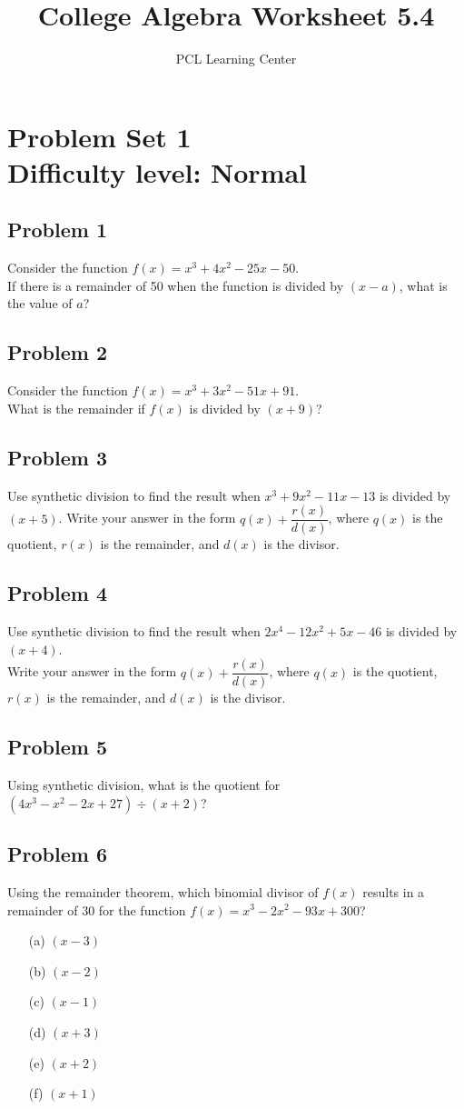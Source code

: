 \documentclass[12pt]{article}
\title{College Algebra Worksheet 5.4}
\author{PCL Learning Center}
\date{}
\begin{document}
\maketitle

\section*{Problem Set 1\\Difficulty level: Normal}
\subsection*{Problem 1} Consider the function \(f(x)=x^3+4x^2-25x-50\).\\
If there is a remainder of 50 when the function is divided by \((x-a)\), what is the value of \(a\)?
\subsection*{Problem 2} Consider the function \(f(x)=x^3+3x^2-51x+91\).\\
What is the remainder if \(f(x)\) is divided by \((x+9)\)?
\subsection*{Problem 3}
Use synthetic division to find the result when \(x^3+9x^2-11x-13\) is divided by \((x+5)\). Write your answer in the form \(q(x)+\dfrac{r(x)}{d(x)}\), where \(q(x)\) is the quotient, \(r(x)\) is the remainder, and \(d(x)\) is the divisor.

\subsection*{Problem 4}
Use synthetic division to find the result when \(2x^4-12x^2+5x-46\) is divided by \((x+4)\).\\
Write your answer in the form \(q(x)+\dfrac{r(x)}{d(x)}\), where \(q(x)\) is the quotient, \(r(x)\) is the remainder, and \(d(x)\) is the divisor.

\subsection*{Problem 5} Using synthetic division, what is the quotient for \((4x^3-x^2-2x+27)\div(x+2)\)?

\subsection*{Problem 6}
Using the remainder theorem, which binomial divisor of \(f(x)\) results in a remainder of 30 for the function \(f(x)=x^3-2x^2-93x+300\)?
\begin{enumerate}
    \item[(a)] \((x-3)\)
    \item[(b)] \((x-2)\)
    \item[(c)] \((x-1)\)
    \item[(d)] \((x+3)\)
    \item[(e)] \((x+2)\)
    \item[(f)] \((x+1)\)
\end{enumerate}
\end{document}
